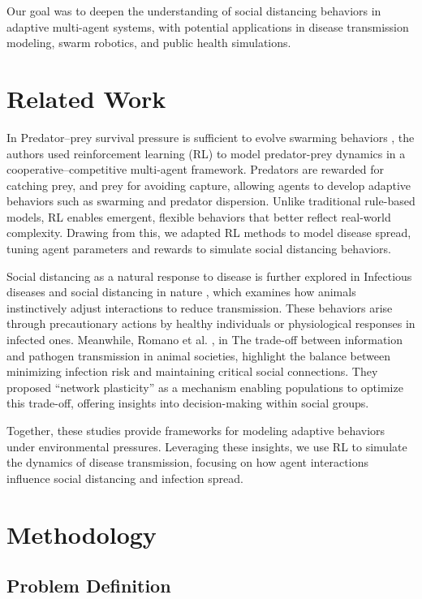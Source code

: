 \documentclass[9pt]{IEEEtran}
\begin{document}
Our goal was to deepen the understanding of social distancing behaviors in adaptive multi-agent systems, with potential applications in disease transmission modeling, swarm robotics, and public health simulations.

\section{Related Work}

In Predator–prey survival pressure is sufficient to evolve swarming behaviors \cite{li2023predator}, the authors used reinforcement learning (RL) to model predator-prey dynamics in a cooperative–competitive multi-agent framework. Predators are rewarded for catching prey, and prey for avoiding capture, allowing agents to develop adaptive behaviors such as swarming and predator dispersion. Unlike traditional rule-based models, RL enables emergent, flexible behaviors that better reflect real-world complexity. Drawing from this, we adapted RL methods to model disease spread, tuning agent parameters and rewards to simulate social distancing behaviors.

Social distancing as a natural response to disease is further explored in Infectious diseases and social distancing in nature \cite{stockmaier2021infectious}, which examines how animals instinctively adjust interactions to reduce transmission. These behaviors arise through precautionary actions by healthy individuals or physiological responses in infected ones. Meanwhile, Romano et al. \cite{romano2022tradeoff}, in The trade-off between information and pathogen transmission in animal societies, highlight the balance between minimizing infection risk and maintaining critical social connections. They proposed “network plasticity” as a mechanism enabling populations to optimize this trade-off, offering insights into decision-making within social groups.

Together, these studies provide frameworks for modeling adaptive behaviors under environmental pressures. Leveraging these insights, we use RL to simulate the dynamics of disease transmission, focusing on how agent interactions influence social distancing and infection spread.

\section{Methodology}

\subsection{Problem Definition}
\end{document}
